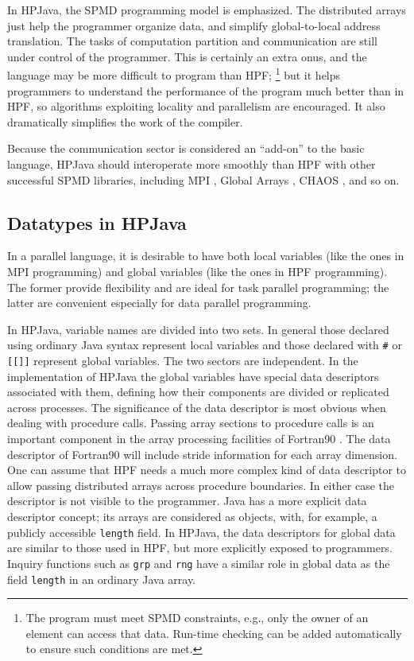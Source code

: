 In HPJava, the SPMD programming model is emphasized.  The distributed
arrays just help the programmer organize data, and simplify
global-to-local address translation.  The tasks of computation
partition and communication are still under control of the programmer.
This is certainly an extra onus, and the language may be more difficult to
program than HPF; \footnote{The program must meet SPMD constraints, e.g.,
only the owner of an element can access that data.  Run-time checking
can be added automatically to ensure such conditions are met.} but
it helps programmers to understand the performance of the program much
better than in HPF, so algorithms exploiting locality and parallelism
are encouraged.  It also dramatically simplifies the work of the
compiler.

Because the communication sector is considered an ``add-on'' to the
basic language, HPJava should interoperate more smoothly than HPF with
other successful SPMD libraries, including MPI \cite{MPIStandard},
Global Arrays \cite{Nie96}, CHAOS \cite{Das94},
and so on.

\subsection{Datatypes in HPJava}

In a parallel language, it is desirable to have both local variables
(like the ones in MPI programming) and global variables (like
the ones in HPF programming).  The former provide flexibility and are
ideal for task parallel programming; the latter are convenient
especially for data parallel programming.

In HPJava, variable names are divided into two sets.  In general those
declared using ordinary Java syntax represent local variables and those
declared with \texttt{\#} or \texttt{[[]]} represent global variables.
The two sectors are independent.  In the implementation of HPJava the
global variables have special data descriptors associated with them,
defining how their components are divided or replicated across
processes.  The significance of the data descriptor is most obvious
when dealing with procedure calls.
Passing array sections to procedure calls is an important component in
the array processing facilities of Fortran90 \cite{Fortran90}.  The data
descriptor of Fortran90 will include stride information for each array
dimension.  One can assume that HPF needs a much more complex kind of
data descriptor to allow passing distributed arrays across procedure
boundaries.  In either case the descriptor is not visible to the
programmer.  Java has a more explicit data descriptor concept; its
arrays are considered as objects, with, for example, a publicly
accessible \texttt{length} field.  In HPJava, the data descriptors for
global data are similar to those used in HPF, but more explicitly
exposed to programmers.  Inquiry functions such as \texttt{grp} and
\texttt{rng} have a similar role in global data as the field
\texttt{length} in an ordinary Java array.

